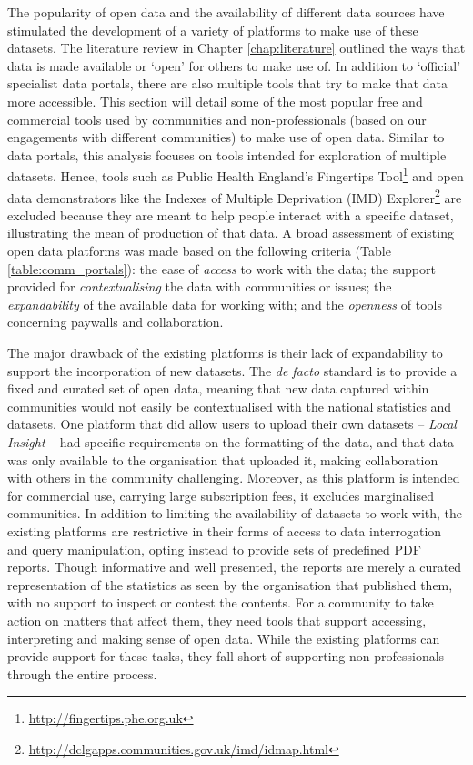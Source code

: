 The popularity of open data and the availability of different data sources have stimulated the development of a variety of platforms to make use of these datasets. The literature review in Chapter \ref{chap:literature} outlined the ways that data is made available or `open' for others to make use of. In addition to `official' specialist data portals, there are also multiple tools that try to make that data more accessible. This section will detail some of the most popular free and commercial tools used by communities and non-professionals (based on our engagements with different communities) to make use of open data. Similar to data portals, this analysis focuses on tools intended for exploration of multiple datasets. Hence, tools such as Public Health England's Fingertips Tool\footnote{\url{http://fingertips.phe.org.uk}} and open data demonstrators like the Indexes of Multiple Deprivation (IMD) Explorer\footnote{\url{http://dclgapps.communities.gov.uk/imd/idmap.html}} are excluded because they are meant to help people interact with a specific dataset, illustrating the mean of production of that data. A broad assessment of existing open data platforms was made based on the following criteria (Table \ref{table:comm_portals}): the ease of \textit{access} to work with the data; the support provided for \textit{contextualising} the data with communities or issues; the \textit{expandability} of the available data for working with; and the \textit{openness} of tools concerning paywalls and collaboration.

The major drawback of the existing platforms is their lack of expandability to support the incorporation of new datasets. The \textit{de facto} standard is to provide a fixed and curated set of open data, meaning that new data captured within communities would not easily be contextualised with the national statistics and datasets. One platform that did allow users to upload their own datasets -- \textit{Local Insight} -- had specific requirements on the formatting of the data, and that data was only available to the organisation that uploaded it, making collaboration with others in the community challenging. Moreover, as this platform is intended for commercial use, carrying large subscription fees, it excludes marginalised communities. In addition to limiting the availability of datasets to work with, the existing platforms are restrictive in their forms of access to data interrogation and query manipulation, opting instead to provide sets of predefined PDF reports. Though informative and well presented, the reports are merely a curated representation of the statistics as seen by the organisation that published them, with no support to inspect or contest the contents. For a community to take action on matters that affect them, they need tools that support accessing, interpreting and making sense of open data. While the existing platforms can provide support for these tasks, they fall short of supporting non-professionals through the entire process.


